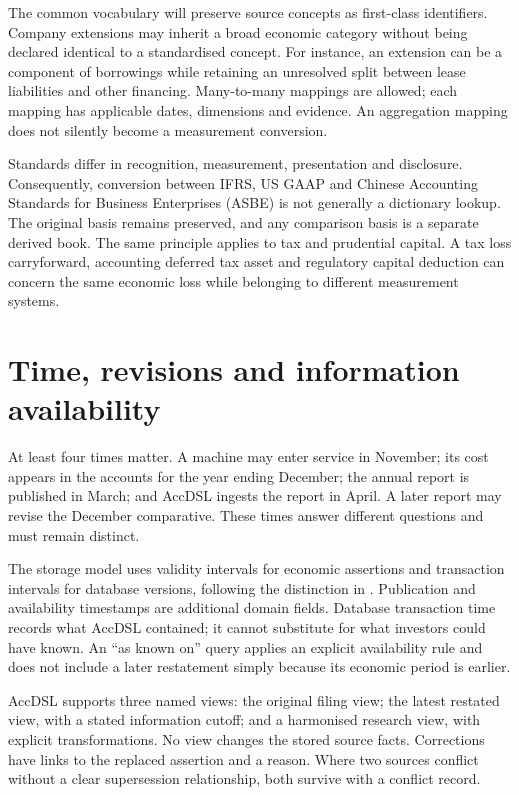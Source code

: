 The common vocabulary will preserve source concepts as first-class identifiers.
Company extensions may inherit a broad economic category without being declared
identical to a standardised concept. For instance, an extension can be a
component of borrowings while retaining an unresolved split between lease
liabilities and other financing. Many-to-many mappings are allowed; each
mapping has applicable dates, dimensions and evidence. An aggregation mapping
does not silently become a measurement conversion.

Standards differ in recognition, measurement, presentation and disclosure.
Consequently, conversion between IFRS, US GAAP and Chinese Accounting Standards
for Business Enterprises (ASBE) is not generally a dictionary lookup.
The original basis remains preserved, and any comparison basis is a separate
derived book. The same principle applies to tax and prudential capital. A tax
loss carryforward, accounting deferred tax asset and regulatory capital
deduction can concern the same economic loss while belonging to different
measurement systems.

\section{Time, revisions and information availability}

At least four times matter. A machine may enter service in November; its cost
appears in the accounts for the year ending December; the annual report is
published in March; and AccDSL ingests the report in April. A later report may
revise the December comparative. These times answer different questions and
must remain distinct.

The storage model uses validity intervals for economic assertions and
transaction intervals for database versions, following the distinction in
\citet{snodgrass1986}. Publication and availability timestamps are additional
domain fields. Database transaction time records what AccDSL contained; it
cannot substitute for what investors could have known. An ``as known on''
query applies an explicit availability rule and does not include a later
restatement simply because its economic period is earlier.

AccDSL supports three named views: the original filing view; the latest
restated view, with a stated information cutoff; and a harmonised research
view, with explicit transformations. No view changes the stored source facts.
Corrections have links to the replaced assertion and a reason. Where two
sources conflict without a clear supersession relationship, both survive with
a conflict record.

